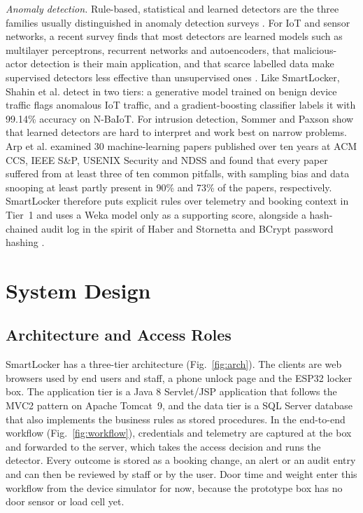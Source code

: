 \documentclass[journal,onecolumn]{IEEEtran}
\begin{document}
\textit{Anomaly detection.} Rule-based, statistical and learned detectors are the three families usually distinguished
in anomaly detection surveys \cite{chandola2009anomaly}. For IoT and sensor networks, a recent survey finds that most
detectors are learned models such as multilayer perceptrons, recurrent networks and autoencoders, that malicious-actor
detection is their main application, and that scarce labelled data make supervised detectors less effective than
unsupervised ones \cite{demedeiros2023anomaly}. Like SmartLocker, Shahin et al. \cite{shahin2025twostage} detect in two
tiers: a generative model trained on benign device traffic flags anomalous IoT traffic, and a gradient-boosting
classifier labels it with 99.14\% accuracy on N-BaIoT. For intrusion detection, Sommer and Paxson
\cite{sommer2010outside} show that learned detectors are hard to interpret and work best on narrow problems. Arp et
al. \cite{arp2022dos} examined 30 machine-learning papers published over ten years at ACM CCS, IEEE S\&P, USENIX
Security and NDSS and found that every paper suffered from at least three of ten common pitfalls, with sampling bias
and data snooping at least partly present in 90\% and 73\% of the papers, respectively. SmartLocker therefore puts
explicit rules over telemetry and booking context in Tier~1 and uses a Weka model \cite{hall2009weka} only as a
supporting score, alongside a hash-chained audit log in the spirit of Haber and Stornetta \cite{haber1991timestamp}
and BCrypt password hashing \cite{provos1999bcrypt}.

\section{System Design}

\subsection{Architecture and Access Roles}

SmartLocker has a three-tier architecture (Fig.~\ref{fig:arch}). The clients are web browsers used by end users and
staff, a phone unlock page and the ESP32 locker box. The application tier is a Java 8 Servlet/JSP application that
follows the MVC2 pattern on Apache Tomcat~9, and the data tier is a SQL Server database that also implements the
business rules as stored procedures. In the end-to-end workflow (Fig.~\ref{fig:workflow}), credentials and telemetry
are captured at the box and forwarded to the server, which takes the access decision and runs the detector. Every
outcome is stored as a booking change, an alert or an audit entry and can then be reviewed by staff or by the user.
Door time and weight enter this workflow from the device simulator for now, because the prototype box has no door
sensor or load cell yet.
\end{document}
